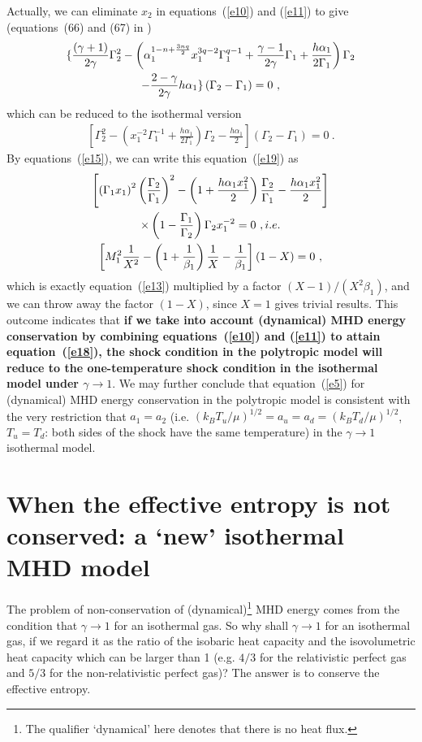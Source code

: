 \documentclass[fleqn,usenatbib]{mnras}
\begin{document}
Actually, we can eliminate $x_{2}$ in equations~(\ref{e10}) and (\ref{e11}) to give (equations~(66) and (67) in \citet{wang2008dynamic})
\begin{gather}
\lbrace \frac{(\gamma+1)}{2\gamma}\Gamma_{2}^{2}-\left(\alpha_{1}^{1-n+\frac{3nq}{2}}x_{1}^{3q-2}\Gamma_{1}^{q-1}+\frac{\gamma-1}{2\gamma}\Gamma_{1}+\frac{h\alpha_{1}}{2\Gamma_{1}}\right)\Gamma_{2}\notag\\
-\frac{2-\gamma}{2\gamma}h\alpha_{1}\rbrace \left(\Gamma_{2}-\Gamma_{1}\right)=0\ ,\label{e18}
\end{gather}
which can be reduced to the isothermal version
\begin{gather}
\left[\Gamma_{2}^{2}-\left(x_{1}^{-2}\Gamma_{1}^{-1}+\frac{h\alpha_{1}}{2\Gamma_{1}}\right)\Gamma_{2}-\frac{h\alpha_{1}}{2}\right]\left(\Gamma_{2}-\Gamma_{1}\right)=0\ .\label{e19}
\end{gather}
By equations~(\ref{e15}), we can write this equation~(\ref{e19}) as
\begin{gather}
\left[\left(\Gamma_{1}x_{1}\right)^{2}\left(\frac{\Gamma_{2}}{\Gamma_{1}}\right)^{2}-\left(1+\frac{h\alpha_{1}x_{1}^{2}}{2}\right)\frac{\Gamma_{2}}{\Gamma_{1}}-\frac{h\alpha_{1}x_{1}^{2}}{2}\right]\notag\\
\times \left(1-\frac{\Gamma_{1}}{\Gamma_{2}}\right)\Gamma_{2}x_{1}^{-2}=0\ , i.e.\notag\\
\left[M_{1}^{2}\frac{1}{X^{2}}-\left(1+\frac{1}{\beta_{1}}\right)\frac{1}{X}-\frac{1}{\beta_{1}}\right](1-X)=0\ ,\label{e20}
\end{gather}
which is exactly equation~(\ref{e13}) multiplied by a factor $(X-1)/\left(X^{2}\beta_{1}\right)$, and we can throw away the factor $\left(1-X\right)$, since $X=1$ gives trivial results. This outcome indicates that \textbf{if we take into account (dynamical) MHD energy conservation by combining equations~(\ref{e10}) and (\ref{e11}) to attain equation~(\ref{e18}), the shock condition in the polytropic model will reduce to the one-temperature shock condition in the isothermal model under $\gamma\rightarrow 1$}. We may further conclude that equation~(\ref{e5}) for (dynamical) MHD energy conservation in the polytropic model is consistent with the very restriction that $a_{1}=a_{2}$ (i.e. $\left(k_{B}T_{u}/\mu\right)^{1/2}=a_{u}=a_{d}=\left(k_{B}T_{d}/\mu\right)^{1/2}$, $T_{u}=T_{d}$: both sides of the shock have the same temperature) in the $\gamma\rightarrow 1$ isothermal model. 

\section{When the effective entropy is not conserved: a `new' isothermal MHD model}
\label{s2}
The problem of non-conservation of (dynamical)\footnote{The qualifier `dynamical' here denotes that there is no heat flux.} MHD energy comes from the condition that $\gamma\rightarrow 1$ for an isothermal gas. So why shall $\gamma\rightarrow 1$ for an isothermal gas, if we regard it as the ratio of the isobaric heat capacity and the isovolumetric heat capacity which can be larger than 1 (e.g. $4/3$ for the relativistic perfect gas and $5/3$ for the non-relativistic perfect gas)? The answer is to conserve the effective entropy. 
\end{document}
